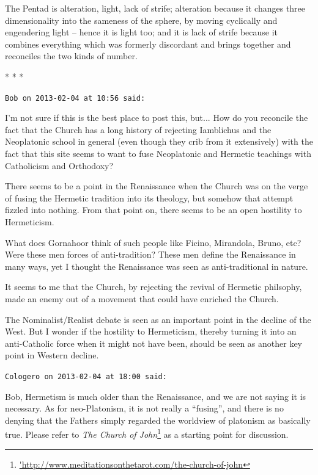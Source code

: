 \begin{quotex}
The Pentad is alteration, light, lack of strife; alteration because it changes three dimensionality into the sameness of the sphere, by moving cyclically and engendering light -- hence it is light too; and it is lack of strife because it combines everything which was formerly discordant and brings together and reconciles the two kinds of number.
\end{quotex}




\begin{center}* * *\end{center}

\begin{footnotesize}
\begin{sffamily}
\texttt{Bob on 2013-02-04 at 10:56 said:}

I'm not sure if this is the best place to post this, but... How do you reconcile the fact that the Church has a long history of rejecting Iamblichus and the Neoplatonic school in general (even though they crib from it extensively) with the fact that this site seems to want to fuse Neoplatonic and Hermetic teachings with Catholicism and Orthodoxy?

There seems to be a point in the Renaissance when the Church was on the verge of fusing the Hermetic tradition into its theology, but somehow that attempt fizzled into nothing. From that point on, there seems to be an open hostility to Hermeticism.

What does Gornahoor think of such people like Ficino, Mirandola, Bruno, etc? Were these men forces of anti-tradition? These men define the Renaissance in many ways, yet I thought the Renaissance was seen as anti-traditional in nature.

It seems to me that the Church, by rejecting the revival of Hermetic philsophy, made an enemy out of a movement that could have enriched the Church.

The Nominalist/Realist debate is seen as an important point in the decline of the West. But I wonder if the hostility to Hermeticism, thereby turning it into an anti-Catholic force when it might not have been, should be seen as another key point in Western decline.

\hfill

\texttt{Cologero on 2013-02-04 at 18:00 said:}

Bob, Hermetism is much older than the Renaissance, and we are not saying it is necessary. As for neo-Platonism, it is not really a ``fusing'', and there is no denying that the Fathers simply regarded the worldview of platonism as basically true. Please refer to \textit{The Church of John}\footnote{\url{'http://www.meditationsonthetarot.com/the-church-of-john}} as a starting point for discussion.


\end{sffamily}
\end{footnotesize}
